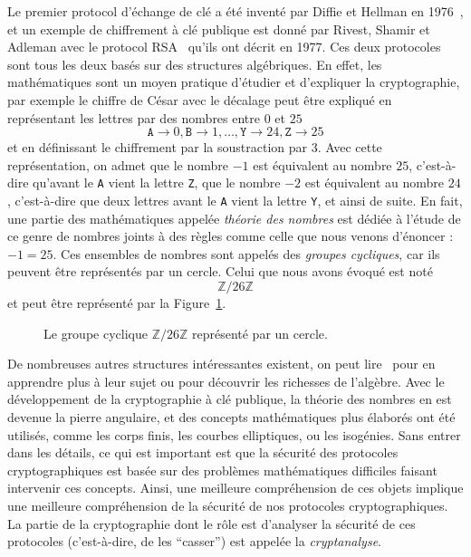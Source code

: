 Le premier protocol d'échange de clé a été inventé par Diffie et Hellman en
1976~\cite{DH76}, et un exemple de chiffrement à clé publique est donné par
Rivest, Shamir et Adleman avec le protocol RSA~\cite{RSA77} qu'ils ont décrit en
1977. Ces deux protocoles sont tous les deux basés sur des structures
algébriques. En effet, les mathématiques sont un moyen pratique d'étudier et
d'expliquer la cryptographie, par exemple le chiffre de César avec le décalage
peut être expliqué en représentant les lettres par des nombres entre $0$ et $25$
\[
  \texttt{A}\to 0, \texttt{B} \to 1, \dots,\texttt{Y}\to24, \texttt{Z}\to25
\]
et en définissant le chiffrement par la soustraction par $3$. Avec cette
représentation, on admet que le nombre $-1$ est équivalent au nombre
$25$, c'est-à-dire qu'avant le \texttt{A} vient la lettre \texttt{Z}, que le
nombre $-2$ est équivalent au nombre $24$, c'est-à-dire que deux lettres avant
le \texttt{A} vient la lettre \texttt{Y}, et ainsi de suite. En fait, une partie
des mathématiques appelée \emph{théorie des nombres} est dédiée à l'étude de ce
genre de nombres joints à des règles comme celle que nous venons d'énoncer :
$-1=25$. Ces ensembles de nombres sont appelés des \emph{groupes cycliques}, car
ils peuvent être représentés par un cercle. Celui que nous avons évoqué est noté
\[
  \mathbb{Z}/26\mathbb{Z}
\]
et peut être représenté par la Figure~\ref{fig:cyclic-group}.
\begin{figure}[h]
  \centering
  \caption{Le groupe cyclique $\mathbb{Z}/26\mathbb{Z}$ représenté par un
cercle.}
  \label{fig:cyclic-group}
\end{figure}
De nombreuses autres structures intéressantes existent, on peut
lire~\cite{Lang04, Perrin96} pour en apprendre plus à leur sujet ou pour
découvrir les richesses de l'algèbre. Avec le développement de la cryptographie
à clé publique, la théorie des nombres en est devenue la pierre angulaire, et
des concepts mathématiques plus élaborés ont été utilisés, comme les corps
finis, les courbes elliptiques, ou les isogénies. Sans entrer dans les détails,
ce qui est important est que la sécurité des protocoles cryptographiques est
basée sur des problèmes mathématiques difficiles faisant intervenir ces
concepts. Ainsi, une meilleure compréhension de ces objets implique une
meilleure compréhension de la sécurité de nos protocoles cryptographiques. La
partie de la cryptographie dont le rôle est d'analyser la sécurité de ces
protocoles (c'est-à-dire, de les ``casser'') est appelée la \emph{cryptanalyse}.


